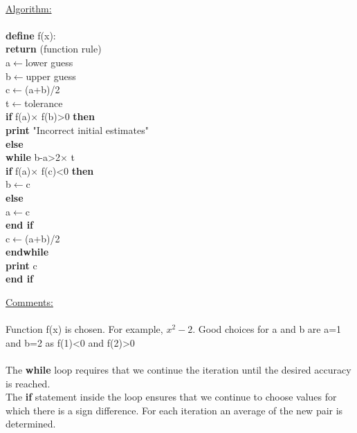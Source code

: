 \documentclass[a4paper,twoside,10pt]{article}
\newcommand{\codeindent}{\indent\hspace{2em}}
\newenvironment{example}[1]{%
	\mbox{}\\\tcolorbox[beamer,breakable,%
		title=Example: #1,standard jigsaw,opacityback=0, colframe=blue!75!black, boxrule=2pt]}{\endtcolorbox\mbox{}\\}
\begin{document}
			\begin{example}{Bisection Method for x-intercepts}
				\begin{minipage}[t]{0.5\textwidth}
					\underline{Algorithm:}\\\\
					\textbf{define} f(x):\\
					\codeindent \textbf{return} (function rule)\\
					a$\leftarrow$lower guess\\
					b$\leftarrow$upper guess\\
					c$\leftarrow$(a+b)/2\\
					t$\leftarrow$tolerance\\
					\textbf{if} f(a)$\times$ f(b)>0 \textbf{then}\\
					\codeindent \textbf{print} "Incorrect initial estimates"\\
					\textbf{else}\\
					\codeindent \textbf{while} b-a>2$\times$ t\\
					\codeindent\codeindent \textbf{if} f(a)$\times$ f(c)<0 \textbf{then}\\
					\codeindent\codeindent\codeindent b$\leftarrow$c\\
					\codeindent\codeindent \textbf{else}\\
					\codeindent\codeindent\codeindent a$\leftarrow$c\\
					\codeindent\codeindent \textbf{end if}\\
					\codeindent\codeindent c$\leftarrow$(a+b)/2\\
					\codeindent\codeindent \textbf{endwhile}\\
					\textbf{print} c\\
					\textbf{end if}
				\end{minipage}
				\hfill
				\begin{minipage}[t]{0.4\textwidth}
					\underline{Comments:}\\\\
					Function f(x) is chosen. For example, $x^2-2$. Good choices for a and b are a=1 and b=2 as f(1)<0 and f(2)>0\\\\
					The \textbf{while} loop requires that we continue the iteration until the desired accuracy is reached.\\
					The \textbf{if} statement inside the loop ensures that we continue to choose values for which there is a sign difference. For each iteration an average of the new pair is determined.
				\end{minipage}				
			\end{example}
\end{document}
